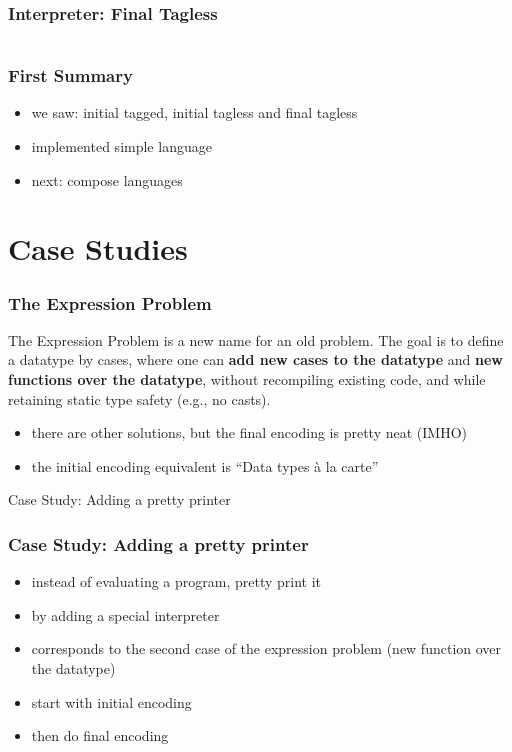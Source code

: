 \documentclass[aspectratio=169, hyperref={colorlinks, linkcolor=beamer@centricgreen}, urlcolor=links]{beamer}
\begin{document}
\begin{frame}[fragile]
  \frametitle{Interpreter: Final Tagless}
  \inputminted[fontsize=\footnotesize]{scala}{snippets/final-tagless-interp.scala}
\end{frame}

\begin{frame}
  \frametitle{First Summary}
  \begin{itemize}
  \item we saw: initial tagged, initial tagless and final tagless
  \item implemented simple language
  \item next: compose languages
  \end{itemize}
\end{frame}

\section{Case Studies}\label{sec:case-studies}

\begin{frame}
  \frametitle{The Expression Problem}
  \begin{tcolorbox}[
    fonttitle=\sffamily\bfseries,
    colbacktitle=black,
    colframe=black,
    coltitle=beamer@centricgreen,
    title=Philip Wadler on 12. November 1998
    ]
    The Expression Problem is a new name for an old problem.  The goal
    is to define a datatype by cases, where one can \textbf{add new
      cases to the datatype} and \textbf{new functions over the
      datatype}, without recompiling existing code, and while
    retaining static type safety (e.g., no casts).
  \end{tcolorbox}
  \begin{itemize}
  \item there are other solutions, but the final encoding is
    pretty neat (IMHO)
  \item the initial encoding equivalent is ``Data types \`{a} la carte''
  \end{itemize}
\end{frame}

\begin{frame}
  \begin{center}
    \Huge
    Case Study: Adding a pretty printer
  \end{center}
\end{frame}

\begin{frame}
  \frametitle{Case Study: Adding a pretty printer}
  \begin{itemize}
  \item instead of evaluating a program, pretty print it
  \item by adding a special interpreter
  \item corresponds to the second case of the expression problem (new function over the datatype)
  \item start with initial encoding
  \item then do final encoding
  \end{itemize}
\end{frame}
\end{document}
